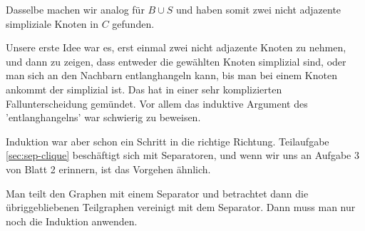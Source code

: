 Dasselbe machen wir analog für $B \cup S$ und haben somit zwei nicht adjazente simpliziale Knoten in $C$ gefunden.

\how

Unsere erste Idee war es, erst einmal zwei nicht adjazente Knoten zu nehmen, und dann zu zeigen, dass entweder die gewählten Knoten simplizial sind, oder man sich an den Nachbarn entlanghangeln kann, bis man bei einem Knoten ankommt der simplizial ist.
Das hat in einer sehr komplizierten Fallunterscheidung gemündet. Vor allem das induktive Argument des 'entlanghangelns' war schwierig zu beweisen.

Induktion war aber schon ein Schritt in die richtige Richtung. Teilaufgabe \ref{sec:sep-clique} beschäftigt sich mit Separatoren, und wenn wir uns an Aufgabe 3 von Blatt 2 erinnern, ist das Vorgehen ähnlich.

Man teilt den Graphen mit einem Separator und betrachtet dann die übriggebliebenen Teilgraphen vereinigt mit dem Separator.
Dann muss man nur noch die Induktion anwenden.


